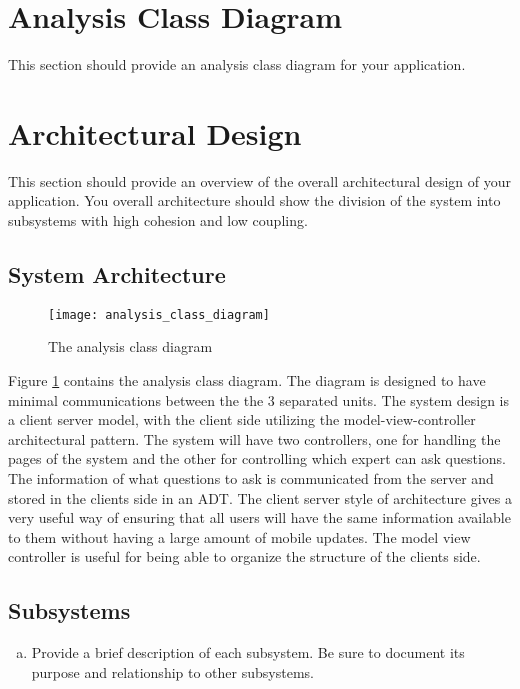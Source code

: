 \documentclass[titlepage]{article}
\begin{document}
\section{Analysis Class Diagram}
\label{sec:analysis_class_diagram}
This section should provide an analysis class diagram for your application.


\section{Architectural Design}
\label{sec:architectural_design}
This section should provide an overview of the overall architectural design of your application. You overall architecture should show the division of the system into subsystems with high cohesion and low coupling.

\subsection{System Architecture}
\label{sub:system_architecture}
	\begin{center}
		\begin{figure}[h!]
			\texttt{[image: analysis\_class\_diagram]}
			\caption{The analysis class diagram}\label{diagram:analysisclass}
		\end{figure}
	\end{center}

Figure \ref{diagram:analysisclass} contains the analysis class diagram. The diagram is designed to have minimal communications between the the 3 separated units. The system design is a client server model, with the client side utilizing the model-view-controller architectural pattern. The system will have two controllers, one for handling the pages of the system and the other for controlling which expert can ask questions. The information of what questions to ask is communicated from the server and stored in the clients side in an ADT. The client server style of architecture gives a very useful way of ensuring that all users will have the same information available to them without having a large amount of mobile updates. The model view controller is useful for being able to organize the structure of the clients side.


\subsection{Subsystems}
\label{sub:subsystems}
\begin{enumerate}[a)]
	\item Provide a brief description of each subsystem. Be sure to document its purpose and relationship to other subsystems.
\end{enumerate}
\end{document}
